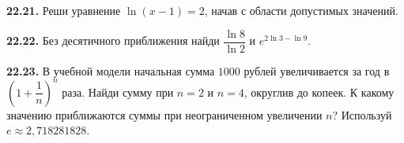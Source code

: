 \noindent\begin{minipage}[t]{\linewidth}\textbf{22.21.} Реши уравнение \(\ln(x-1)=2\), начав с области допустимых значений.\par\end{minipage}\par
\noindent\begin{minipage}[t]{\linewidth}\textbf{22.22.} Без десятичного приближения найди \(\dfrac{\ln8}{\ln2}\) и \(e^{2\ln3-\ln9}\).\par\end{minipage}\par
\noindent\begin{minipage}[t]{\linewidth}\textbf{22.23.} В учебной модели начальная сумма \(1000\) рублей увеличивается за год в \((1+\dfrac1n)^n\) раза. Найди сумму при \(n=2\) и \(n=4\), округлив до копеек. К какому значению приближаются суммы при неограниченном увеличении \(n\)? Используй \(e\approx2{,}718281828\).\par\end{minipage}\par
\endgroup
